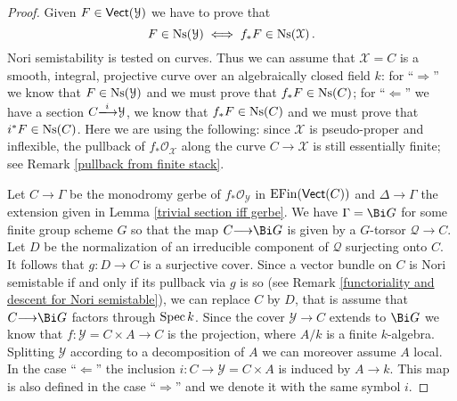 \documentclass[12pt,reqno]{amsart}
\theoremstyle{plain}
\theoremstyle{definition}
\numberwithin{thm}{section}
\newcounter{x}\setcounter{x}{1}
\theoremstyle{plain}
\begin{document}
\begin{proof}
Given $F\in {\text{\sf Vect}}({\mathcal{Y}})$ we have to prove that $$F\in {\textup{Ns}}({\mathcal{Y}}) \iff f_*F\in {\textup{Ns}}({\mathcal{X}})\, .$$
Nori semistability is tested on curves. Thus we can assume that ${\mathcal{X}}=C$ is a smooth, integral,
projective curve over an algebraically closed field $k$: for ``$\Longrightarrow$'' we know that
$F\in {\textup{Ns}}({\mathcal{Y}})$ and we must prove that $f_*F\in {\textup{Ns}}(C)$; for ``$\Longleftarrow$'' we have a
section $C{\xlongrightarrow{i}} {\mathcal{Y}}$, we know that $f_*F\in {\textup{Ns}}(C)$ and we must prove that $i^*F\in {\textup{Ns}}(C)$.
Here we are using the following: since ${\mathcal{X}}$ is pseudo-proper and inflexible, the pullback
of $f_*{\mathcal{O}_{\mathcal{X}}}$ along the curve $C{\longrightarrow} {\mathcal{X}}$ is still essentially finite;
see Remark \ref{pullback from finite stack}.

Let $C{\longrightarrow} \Gamma$ be the monodromy gerbe of $f_*{\mathcal{O}_{\mathcal{Y}}}$ in ${{\rm EFin}}({\text{\sf Vect}}(C))$ and $\Delta{\longrightarrow} 
\Gamma$ the extension given in Lemma \ref{trivial section iff gerbe}. We have $\Gamma=\Bi G$ for some 
finite group scheme $G$ so that the map $C{\longrightarrow} \Bi G$ is given by a $G$-torsor ${\mathcal{Q}}{\longrightarrow} C$. Let 
$D$ be the normalization of an irreducible component of ${\mathcal{Q}}$ surjecting onto $C$. It follows 
that $g\colon D{\longrightarrow} C$ is a surjective cover. Since a vector bundle on $C$ is Nori semistable if 
and only if its pullback via $g$ is so (see Remark
\ref{functoriality and descent for Nori semistable}), 
we can replace $C$ by $D$, that is assume that $C{\longrightarrow} \Bi G$ factors through ${{\rm Spec \,}} k$. Since 
the cover ${\mathcal{Y}}{\longrightarrow} C$ extends to $\Bi G$ we know that $f\colon {\mathcal{Y}}=C\times A {\longrightarrow} C$ is the 
projection, where $A/k$ is a finite $k$-algebra. Splitting ${\mathcal{Y}}$ according to a decomposition 
of $A$ we can moreover assume $A$ local. In the case ``$\Longleftarrow$'' the inclusion $i\colon 
C{\longrightarrow} {\mathcal{Y}}=C\times A$ is induced by $A{\longrightarrow} k$. This map is also defined in the case 
``$\Longrightarrow$'' and we denote it with the same symbol $i$.


\end{proof}
\end{document}

